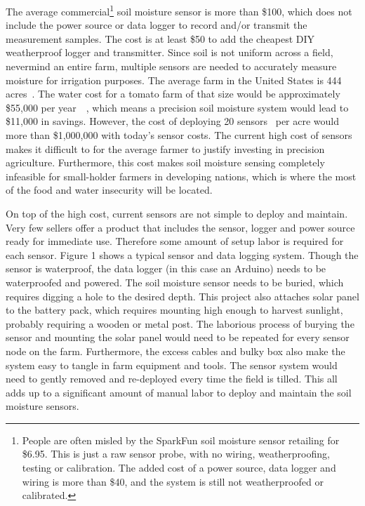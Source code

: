 \documentclass[12pt]{article}
\begin{document}
The average commercial\footnote{People are often misled by the
  SparkFun soil moisture sensor retailing for \$6.95. This is just a
  raw sensor probe, with no wiring, weatherproofing, testing or
  calibration. The added cost of a power source, data logger and
  wiring is more than \$40, and the system is still not weatherproofed
  or calibrated.} soil moisture sensor is more than \$100, which does
not include the power source or data logger to record and/or transmit
the measurement samples. The cost is at least \$50 to add the cheapest
DIY weatherproof logger and transmitter.  Since soil is not uniform
across a field, nevermind an entire farm, multiple sensors are needed
to accurately measure moisture for irrigation purposes. The average
farm in the United States is 444 acres~\cite{farmsize}. The water cost
for a tomato farm of that size would be approximately \$55,000 per
year~\cite{agwater}~\cite{tomatoes}, which means a precision soil
moisture system would lead to \$11,000 in savings. However, the cost
of deploying 20 sensors~\cite{sensorDensity} per acre would more than
\$1,000,000 with today's sensor costs. The current high cost of
sensors makes it difficult to for the average farmer to justify
investing in precision agriculture. Furthermore, this cost makes soil
moisture sensing completely infeasible for small-holder farmers in
developing nations, which is where the most of the food and water
insecurity will be located.

On top of the high cost, current sensors are not simple to deploy and
maintain. Very few sellers offer a product that includes the sensor,
logger and power source ready for immediate use. Therefore some amount
of setup labor is required for each sensor. Figure 1 shows a typical
sensor and data logging system. Though the sensor is waterproof, the
data logger (in this case an Arduino) needs to be waterproofed and
powered. The soil moisture sensor needs to be buried, which requires
digging a hole to the desired depth. This project also attaches solar
panel to the battery pack, which requires mounting high enough to
harvest sunlight, probably requiring a wooden or metal post. The
laborious process of burying the sensor and mounting the solar panel
would need to be repeated for every sensor node on the
farm. Furthermore, the excess cables and bulky box also make the
system easy to tangle in farm equipment and tools. The sensor system
would need to gently removed and re-deployed every time the field is
tilled. This all adds up to a significant amount of manual labor to
deploy and maintain the soil moisture sensors.
\end{document}
